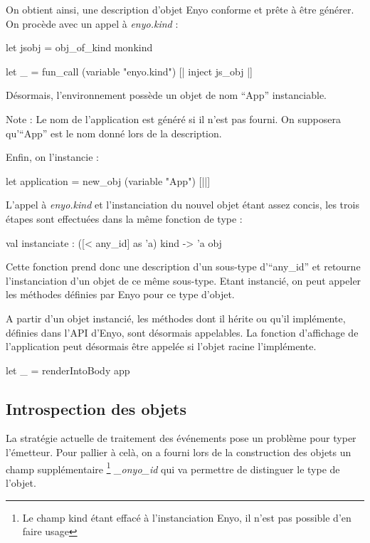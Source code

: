 \documentclass[11pt,a4paper]{report}
\begin{document}
On obtient ainsi, une description d'objet Enyo conforme et prête à être générer.
On procède avec un appel à \emph{enyo.kind} :

\begin{OCaml}
  let jsobj = obj_of_kind monkind
  
  let _ = fun_call (variable "enyo.kind") [| inject js_obj |]
\end{OCaml}

Désormais, l'environnement possède un objet de nom ``App'' instanciable.

Note : Le nom de l'application est généré si il n'est pas fourni. On supposera qu'``App'' est
le nom donné lors de la description.

Enfin, on l'instancie :
\begin{OCaml}
  let application = new_obj (variable "App") [||]
\end{OCaml}

L'appel à \emph{enyo.kind} et l'instanciation du nouvel objet étant assez concis,
les trois étapes sont effectuées dans la même fonction de type : 
\begin{OCaml}
  val instanciate : ([< any_id] as 'a) kind -> 'a obj
\end{OCaml}

Cette fonction prend donc une description d'un sous-type d'``any\_id'' et retourne 
l'instanciation d'un objet de ce même sous-type. Etant instancié, on peut appeler les méthodes
définies par Enyo pour ce type d'objet.


A partir d'un objet instancié, les méthodes dont il hérite ou qu'il implémente, définies dans l'API d'Enyo,
sont désormais appelables. La fonction d'affichage de l'application peut désormais être appelée si
l'objet racine l'implémente.

\begin{OCaml}
  let _ = renderIntoBody app
\end{OCaml}

\subsection{Introspection des objets}\label{introspec}

La stratégie actuelle de traitement des événements pose un problème pour typer l'émetteur.
Pour pallier à celà, on a fourni lors de la construction des objets un champ supplémentaire
\footnote{Le champ kind étant effacé à l'instanciation Enyo, il n'est pas possible d'en faire usage} 
\emph{\_onyo\_id} qui va permettre de distinguer le type de l'objet.
\end{document}
